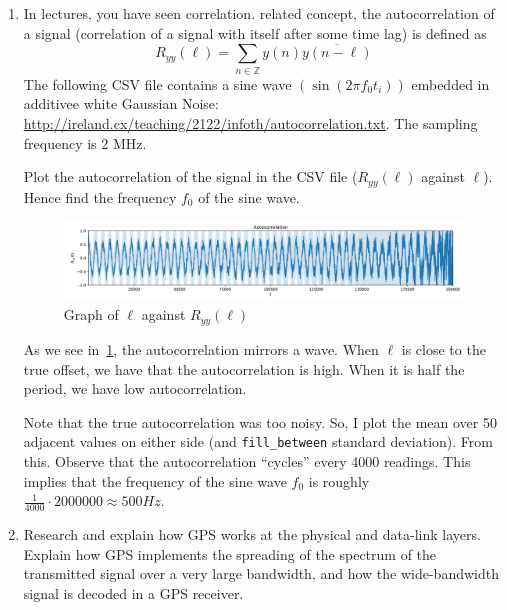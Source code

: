 \documentclass[10pt,\jkfside,a4paper]{article}
\begin{document}
\begin{enumerate}
\begin{enumerate}
        \item In lectures, you have seen correlation.  related concept, the autocorrelation of a signal (correlation of a signal with itself after some time lag) is defined as
        \[
            R_{yy}(\ell) = \sum_{n \in \mathbb Z} y(n) \overline{y(n - \ell)}
        \]
        The following CSV file contains a sine wave $(\sin(2\pi f_0 t_i))$ embedded in additivee white Gaussian Noise: \url{http://ireland.cx/teaching/2122/infoth/autocorrelation.txt}. The sampling frequency is 2 MHz.

        Plot the autocorrelation of the signal in the CSV file ($R_{yy}(\ell)$ against $\ell$). Hence find the frequency $f_0$ of the sine wave.

        \begin{figure}[H]

            \includegraphics[width=\textwidth]{./autocorelation.pdf}

            \caption{Graph of $\ell$ against $R_{yy}(\ell)$}

            \label{fig:sinewave}

        \end{figure}

        As we see in~\cref{fig:sinewave}, the autocorrelation mirrors a wave. When $\ell$ is close to the true offset, we have that the autocorrelation is high. When it is half the period, we have low autocorrelation.

        Note that the true autocorrelation was too noisy. So, I plot the mean over 50 adjacent values on either side (and \texttt{fill\_between} standard deviation). From this. Observe that the autocorrelation ``cycles'' every 4000 readings. This implies that the frequency of the sine wave $f_0$ is roughly $\frac{1}{4000} \cdot 2000000 \approx 500Hz$.

        \item Research and explain how GPS works at the physical and data-link layers. Explain how GPS implements the spreading of the spectrum of the transmitted signal over a very large bandwidth, and how the wide-bandwidth signal is decoded in a GPS receiver.



\end{enumerate}
\end{enumerate}
\end{document}
